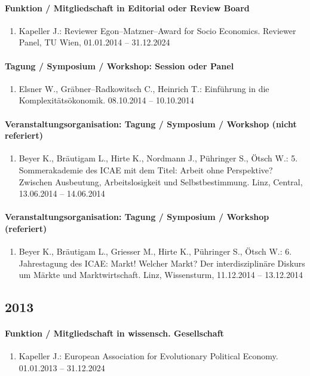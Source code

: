 \paragraph{Funktion / Mitgliedschaft in Editorial oder Review Board}
\begin{enumerate}[leftmargin=*, labelsep=0.5cm]
\item Kapeller J.: Reviewer Egon--Matzner--Award for Socio Economics. Reviewer Panel, TU Wien, 01.01.2014 -- 31.12.2024
\end{enumerate}
\paragraph{Tagung / Symposium / Workshop: Session oder Panel}
\begin{enumerate}[leftmargin=*, labelsep=0.5cm]
\item Elsner W., Gräbner--Radkowitsch C., Heinrich T.: Einführung in die Komplexitätsökonomik. 08.10.2014 -- 10.10.2014
\end{enumerate}
\paragraph{Veranstaltungsorganisation: Tagung / Symposium / Workshop (nicht referiert)}
\begin{enumerate}[leftmargin=*, labelsep=0.5cm]
\item Beyer K., Bräutigam L., Hirte K., Nordmann J., Pühringer S., Ötsch W.: 5. Sommerakademie des ICAE mit dem Titel: Arbeit ohne Perspektive? Zwischen Ausbeutung, Arbeitslosigkeit und Selbstbestimmung. Linz, Central, 13.06.2014 -- 14.06.2014
\end{enumerate}
\paragraph{Veranstaltungsorganisation: Tagung / Symposium / Workshop (referiert)}
\begin{enumerate}[leftmargin=*, labelsep=0.5cm]
\item Beyer K., Bräutigam L., Griesser M., Hirte K., Pühringer S., Ötsch W.: 6. Jahrestagung des ICAE: Markt! Welcher Markt? Der interdisziplinäre Diskurs um Märkte und Marktwirtschaft. Linz, Wissensturm, 11.12.2014 -- 13.12.2014
\end{enumerate}\subsection*{2013}\paragraph{Funktion / Mitgliedschaft in wissensch. Gesellschaft}
\begin{enumerate}[leftmargin=*, labelsep=0.5cm]
\item Kapeller J.: European Association for Evolutionary Political Economy. 01.01.2013 -- 31.12.2024
\end{enumerate}
